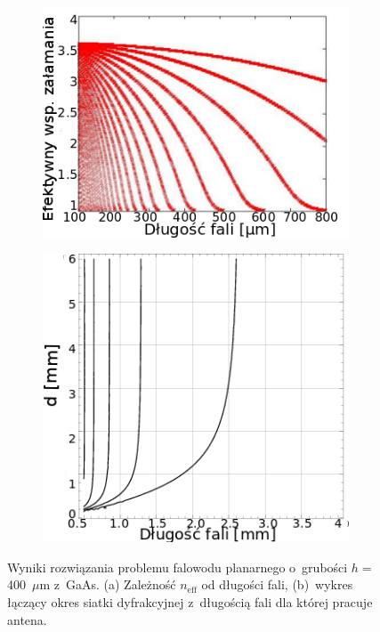 \begin{figure}
\begin{subfigure}{0.5\textwidth}
        \includegraphics[width=\textwidth]{images/thz/gaas-neffeps.png}
	\caption{}
	\label{fig:gaas-effn}
\end{subfigure}
\begin{subfigure}{0.5\textwidth}
        \includegraphics[width=\textwidth]{images/antenaThz/d_lambda.png}
	\caption{}
	\label{fig:d-lusok}
\end{subfigure}
\caption{Wyniki rozwiązania problemu falowodu planarnego o~grubości $h=$400~$\mu$m z~GaAs.  (a) Zależność $n_{\textrm{eff}}$ od długości fali, (b)~wykres łączący okres siatki dyfrakcyjnej z~długością fali dla której pracuje antena. }
\end{figure}



